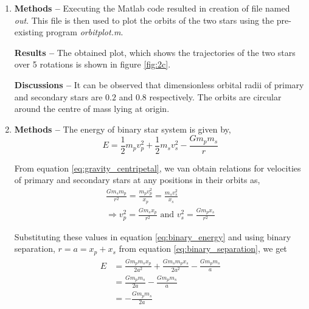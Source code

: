 \documentclass[a4paper]{article}
\begin{document}
\begin{enumerate} [label*=\textbf{(\alph*)}]
			
			\item
				\subitem \textbf{Methods  --}
				Executing the Matlab code resulted in creation of file named \emph{out}. This file is then used to plot the orbits of the two stars using the pre-existing program \emph{orbitplot.m}.
				
				\subitem \textbf{Results  --}
				The obtained plot, which shows the trajectories of the two stars over 5 rotations is shown in figure \ref{fig:2c}. 
				
				\subitem \textbf{Discussions  --}
				It can be observed that dimensionless orbital radii of primary and secondary stars are \(0.2\) and \(0.8\) respectively. The orbits are circular around the centre of mass lying at origin.
			
			
			\item
				\subitem \textbf{Methods  --}
				The energy of binary star system is given by,
				\begin{equation}
					E = \frac{1}{2} m_p v_p^2 + \frac{1}{2} m_s v_s^2 - \frac{G m_p m_s}{r}
					\label{eq:binary_energy}
				\end{equation}
				
				From equation \ref{eq:gravity_centripetal}, we van obtain relations for velocities of primary and secondary stars at any positions in their orbits as,
				\begin{equation}
					\begin{gathered}
						\frac{G m_s m_p}{r^2} = \frac{m_p v_p^2}{x_p} = \frac{m_s v_s^2}{x_s} \\
						\Rightarrow v_p^2 = \frac{G m_s x_p}{r^2} \text{ and } v_s^2 = \frac{G m_p x_s}{r^2}
					\end{gathered}
				\end{equation}
				
				Substituting these values in equation \ref{eq:binary_energy} and using binary separation, \(r = a = x_p+x_s\) from equation \ref{eq:binary_separation}, we get
				\begin{equation}
					\begin{gathered}
						\begin{aligned}
							E &= \frac{G m_p m_s x_p}{2a^2} + \frac{G m_s m_p x_s}{2a^2} - \frac{G m_p m_s}{a} \\
							&= \frac{G m_p m_s}{2a} - \frac{G m_p m_s}{a}\\
							&= -\frac{G m_p m_s}{2a} 
						\end{aligned}
					\end{gathered}
				\end{equation}
				

\end{enumerate}
\end{document}
